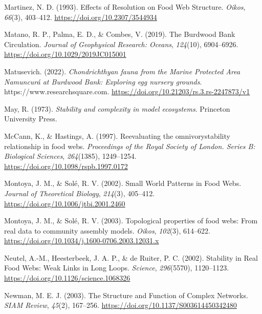 \documentclass[preprint, 3p,
authoryear]{elsarticle} %
\newlength{\cslhangindent}
\newlength{\cslentryspacingunit} %
\newenvironment{CSLReferences}[2] %
 {%
  \setlength{\parindent}{0pt}
  \ifodd #1
  \let\oldpar\par
  \def\par{\hangindent=\cslhangindent\oldpar}
  \fi
  \setlength{\parskip}{#2\cslentryspacingunit}
 }%
 {}
\begin{document}
\begin{CSLReferences}{1}{0}
\leavevmode{}%
Martinez, N. D. (1993). Effects of {Resolution} on {Food Web Structure}.
\emph{Oikos}, \emph{66}(3), 403--412.
\url{https://doi.org/10.2307/3544934}

\leavevmode{}%
Matano, R. P., Palma, E. D., \& Combes, V. (2019). The {Burdwood Bank
Circulation}. \emph{Journal of Geophysical Research: Oceans},
\emph{124}(10), 6904--6926. \url{https://doi.org/10.1029/2019JC015001}

\leavevmode{}%
Matusevich. (2022). \emph{Chondrichthyan fauna from the {Marine
Protected Area Namuncurá} at {Burdwood Bank}: Exploring egg nursery
grounds}. https://www.researchsquare.com.
\url{https://doi.org/10.21203/rs.3.rs-2247873/v1}

\leavevmode{}%
May, R. (1973). \emph{Stability and complexity in model ecosystems}.
{Princeton University Press}.

\leavevmode{}%
McCann, K., \& Hastings, A. (1997). Re\textendash evaluating the
omnivory\textendash stability relationship in food webs.
\emph{Proceedings of the Royal Society of London. Series B: Biological
Sciences}, \emph{264}(1385), 1249--1254.
\url{https://doi.org/10.1098/rspb.1997.0172}

\leavevmode{}%
Montoya, J. M., \& Solé, R. V. (2002). Small {World Patterns} in {Food
Webs}. \emph{Journal of Theoretical Biology}, \emph{214}(3), 405--412.
\url{https://doi.org/10.1006/jtbi.2001.2460}

\leavevmode{}%
Montoya, J. M., \& Solé, R. V. (2003). Topological properties of food
webs: From real data to community assembly models. \emph{Oikos},
\emph{102}(3), 614--622.
\url{https://doi.org/10.1034/j.1600-0706.2003.12031.x}

\leavevmode{}%
Neutel, A.-M., Heesterbeek, J. A. P., \& de Ruiter, P. C. (2002).
Stability in {Real Food Webs}: {Weak Links} in {Long Loops}.
\emph{Science}, \emph{296}(5570), 1120--1123.
\url{https://doi.org/10.1126/science.1068326}

\leavevmode{}%
Newman, M. E. J. (2003). The {Structure} and {Function} of {Complex
Networks}. \emph{SIAM Review}, \emph{45}(2), 167--256.
\url{https://doi.org/10.1137/S003614450342480}


\end{CSLReferences}
\end{document}
